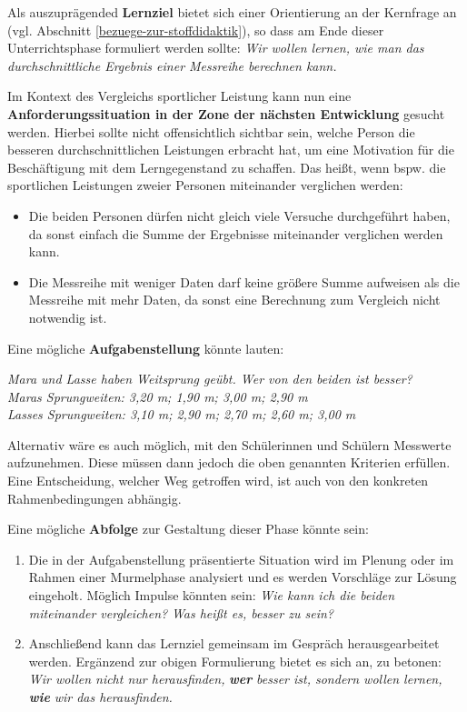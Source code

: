 \documentclass[
]{scrbook}
\providecommand{\tightlist}{%
  \setlength{\itemsep}{0pt}\setlength{\parskip}{0pt}}
\theoremstyle{definition}
\theoremstyle{definition}
\theoremstyle{definition}
\theoremstyle{definition}
\theoremstyle{remark}
\begin{document}
Als auszuprägended \textbf{Lernziel} bietet sich einer Orientierung an der Kernfrage an (vgl. Abschnitt \ref{bezuege-zur-stoffdidaktik}), so dass am Ende dieser Unterrichtsphase formuliert werden sollte: \emph{Wir wollen lernen, wie man das durchschnittliche Ergebnis einer Messreihe berechnen kann.}

Im Kontext des Vergleichs sportlicher Leistung kann nun eine \textbf{Anforderungssituation in der Zone der nächsten Entwicklung} gesucht werden. Hierbei sollte nicht offensichtlich sichtbar sein, welche Person die besseren durchschnittlichen Leistungen erbracht hat, um eine Motivation für die Beschäftigung mit dem Lerngegenstand zu schaffen. Das heißt, wenn bspw. die sportlichen Leistungen zweier Personen miteinander verglichen werden:

\begin{itemize}
\tightlist
\item
  Die beiden Personen dürfen nicht gleich viele Versuche durchgeführt haben, da sonst einfach die Summe der Ergebnisse miteinander verglichen werden kann.
\item
  Die Messreihe mit weniger Daten darf keine größere Summe aufweisen als die Messreihe mit mehr Daten, da sonst eine Berechnung zum Vergleich nicht notwendig ist.
\end{itemize}

Eine mögliche \textbf{Aufgabenstellung} könnte lauten:

\emph{Mara und Lasse haben Weitsprung geübt. Wer von den beiden ist besser?}\\
\emph{Maras Sprungweiten: 3,20 m; 1,90 m; 3,00 m; 2,90 m}\\
\emph{Lasses Sprungweiten: 3,10 m; 2,90 m; 2,70 m; 2,60 m; 3,00 m}

Alternativ wäre es auch möglich, mit den Schülerinnen und Schülern Messwerte aufzunehmen. Diese müssen dann jedoch die oben genannten Kriterien erfüllen. Eine Entscheidung, welcher Weg getroffen wird, ist auch von den konkreten Rahmenbedingungen abhängig.

Eine mögliche \textbf{Abfolge} zur Gestaltung dieser Phase könnte sein:

\begin{enumerate}
\def\labelenumi{\arabic{enumi}.}
\tightlist
\item
  Die in der Aufgabenstellung präsentierte Situation wird im Plenung oder im Rahmen einer Murmelphase analysiert und es werden Vorschläge zur Lösung eingeholt. Möglich Impulse könnten sein: \emph{Wie kann ich die beiden miteinander vergleichen?} \emph{Was heißt es, besser zu sein?}
\item
  Anschließend kann das Lernziel gemeinsam im Gespräch herausgearbeitet werden. Ergänzend zur obigen Formulierung bietet es sich an, zu betonen: \emph{Wir wollen nicht nur herausfinden,} \textbf{\emph{wer}} \emph{besser ist, sondern wollen lernen,} \textbf{\emph{wie}} \emph{wir das herausfinden.}
\end{enumerate}
\end{document}
